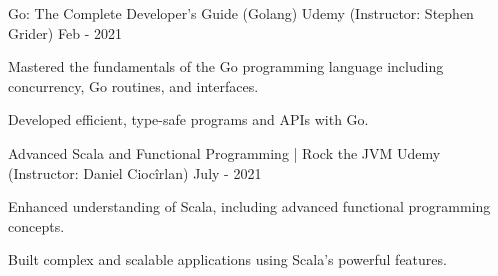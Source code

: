 \begin{cventries}
  \cventry
    {Go: The Complete Developer's Guide (Golang)} %
    {Udemy (Instructor: Stephen Grider)} %
    {} %
    {Feb - 2021} %
    {
      \begin{cvitems} %
        \item {Mastered the fundamentals of the Go programming language including concurrency, Go routines, and interfaces.}
        \item {Developed efficient, type-safe programs and APIs with Go.}
      \end{cvitems}
    }

  \cventry
    {Advanced Scala and Functional Programming | Rock the JVM} %
    {Udemy (Instructor: Daniel Ciocîrlan)} %
    {} %
    {July - 2021} %
    {
      \begin{cvitems} %
        \item {Enhanced understanding of Scala, including advanced functional programming concepts.}
        \item {Built complex and scalable applications using Scala's powerful features.}
      \end{cvitems}
    }


\end{cventries}
